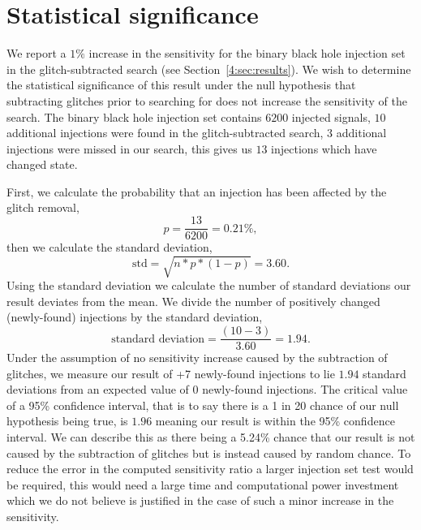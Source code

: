\section{\label{4:sec:apdx_stat_sig}Statistical significance}

We report a $1\%$ increase in the sensitivity for the binary black hole injection set in the glitch-subtracted \gwadj search (see Section~\ref{4:sec:results}). We wish to determine the statistical significance of this result under the null hypothesis that subtracting \scladj glitches prior to searching for \gws does not increase the sensitivity of the \gwadj search. The binary black hole injection set contains $6200$ injected signals, $10$ additional injections were found in the glitch-subtracted \gwadj search, $3$ additional injections were missed in our search, this gives us $13$ injections which have changed state.

First, we calculate the probability that an injection has been affected by the glitch removal, 
%
\begin{equation}
    p = \frac{13}{6200} = 0.21\% ,
\end{equation}
%
then we calculate the standard deviation, 
%
\begin{equation}
    \textrm{std} = \sqrt{n * p * (1 - p)} = 3.60 .
\end{equation}
%
Using the standard deviation we calculate the number of standard deviations our result deviates from the mean. We divide the number of positively changed (newly-found) injections by the standard deviation, 
%
\begin{equation}
    \textrm{standard deviation} = \frac{(10 - 3)}{3.60} = 1.94 .
\end{equation}
%
Under the assumption of no sensitivity increase caused by the subtraction of glitches, we measure our result of +7 newly-found \gwadj injections to lie $1.94$ standard deviations from an expected value of $0$ newly-found injections. The critical value of a 95\% confidence interval, that is to say there is a 1 in 20 chance of our null hypothesis being true, is $1.96$ meaning our result is within the 95\% confidence interval. We can describe this as there being a 5.24\% chance that our result is not caused by the subtraction of glitches but is instead caused by random chance. To reduce the error in the computed sensitivity ratio a larger injection set test would be required, this would need a large time and computational power investment which we do not believe is justified in the case of such a minor increase in the sensitivity.

